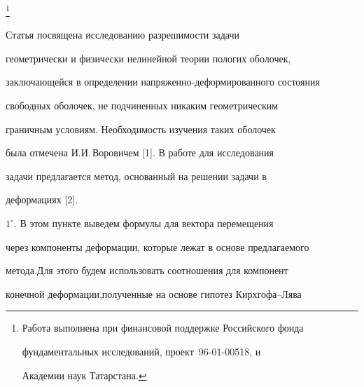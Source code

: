  


\thanks{Работа выполнена при финансовой поддержке Российского фонда 


фундаментальных исследований, проект \No\,96-01-00518, и 


Академии наук Татарстана.} 


\date{} 




 


\pagestyle{plain} %


 


 




 


\maketitle 


\label{begin} 


 


Статья посвящена исследованию разрешимости задачи 


геометрически и физически нелинейной теории пологих оболочек, 


заключающейся в определении напряженно-деформированного состояния  


свободных оболочек, не подчиненных никаким геометрическим 


граничным условиям. Необходимость изучения таких оболочек 


была отмечена И.И.\,Воровичем [1]. В работе для исследования  


задачи предлагается метод, основанный на решении задачи в  


деформациях [2]. 


\medskip 


 


 


$1^\circ$. В этом пункте выведем формулы для вектора перемещения 


через компоненты деформации, которые лежат в основе предлагаемого  


метода.Для этого будем использовать соотношения для компонент  


конечной деформации,полученные на основе гипотез Кирхгофа--Лява 



